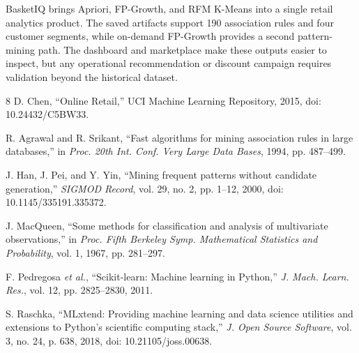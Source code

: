 \documentclass[10pt,conference]{IEEEtran}
\begin{document}
BasketIQ brings Apriori, FP-Growth, and RFM K-Means into a single retail analytics product. The saved artifacts support 190 association rules and four customer segments, while on-demand FP-Growth provides a second pattern-mining path. The dashboard and marketplace make these outputs easier to inspect, but any operational recommendation or discount campaign requires validation beyond the historical dataset.

\begin{thebibliography}{8}
D. Chen, ``Online Retail,'' UCI Machine Learning Repository, 2015, doi: 10.24432/C5BW33.

R. Agrawal and R. Srikant, ``Fast algorithms for mining association rules in large databases,'' in \emph{Proc. 20th Int. Conf. Very Large Data Bases}, 1994, pp. 487--499.

J. Han, J. Pei, and Y. Yin, ``Mining frequent patterns without candidate generation,'' \emph{SIGMOD Record}, vol. 29, no. 2, pp. 1--12, 2000, doi: 10.1145/335191.335372.

J. MacQueen, ``Some methods for classification and analysis of multivariate observations,'' in \emph{Proc. Fifth Berkeley Symp. Mathematical Statistics and Probability}, vol. 1, 1967, pp. 281--297.

F. Pedregosa \emph{et al.}, ``Scikit-learn: Machine learning in Python,'' \emph{J. Mach. Learn. Res.}, vol. 12, pp. 2825--2830, 2011.

S. Raschka, ``MLxtend: Providing machine learning and data science utilities and extensions to Python's scientific computing stack,'' \emph{J. Open Source Software}, vol. 3, no. 24, p. 638, 2018, doi: 10.21105/joss.00638.
\end{thebibliography}
\end{document}
